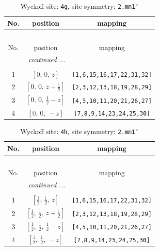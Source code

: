 \documentclass[fleqn,8pt]{jsarticle}
\begin{document}
\renewcommand{\arraystretch}{1.2}
\begin{longtable}{ccc}
\caption{Wyckoff site: {\tt 4g}, site symmetry: {\tt 2.mm1'}}
 \\
 \hline \hline
No. & position & mapping \\ \hline \endfirsthead

\multicolumn{2}{l}{\tablename\ \thetable{}} \\
 \hline \hline
No. & position & mapping \\ \hline \endhead

 \hline \hline
\multicolumn{2}{r}{\footnotesize\it continued ...} \\ \endfoot

 \hline \hline
\multicolumn{2}{r}{} \\ \endlastfoot

1 & $\left[ 0,\, 0,\, z \right]$ & {\tt [1,6,15,16,17,22,31,32]} \\ \hline
2 & $\left[ 0,\, 0,\, z + \frac{1}{2} \right]$ & {\tt [2,3,12,13,18,19,28,29]} \\ \hline
3 & $\left[ 0,\, 0,\, \frac{1}{2} - z \right]$ & {\tt [4,5,10,11,20,21,26,27]} \\ \hline
4 & $\left[ 0,\, 0,\, - z \right]$ & {\tt [7,8,9,14,23,24,25,30]} \\
\end{longtable}
\renewcommand{\arraystretch}{1.2}
\begin{longtable}{ccc}
\caption{Wyckoff site: {\tt 4h}, site symmetry: {\tt 2.mm1'}}
 \\
 \hline \hline
No. & position & mapping \\ \hline \endfirsthead

\multicolumn{2}{l}{\tablename\ \thetable{}} \\
 \hline \hline
No. & position & mapping \\ \hline \endhead

 \hline \hline
\multicolumn{2}{r}{\footnotesize\it continued ...} \\ \endfoot

 \hline \hline
\multicolumn{2}{r}{} \\ \endlastfoot

1 & $\left[ \frac{1}{2},\, \frac{1}{2},\, z \right]$ & {\tt [1,6,15,16,17,22,31,32]} \\ \hline
2 & $\left[ \frac{1}{2},\, \frac{1}{2},\, z + \frac{1}{2} \right]$ & {\tt [2,3,12,13,18,19,28,29]} \\ \hline
3 & $\left[ \frac{1}{2},\, \frac{1}{2},\, \frac{1}{2} - z \right]$ & {\tt [4,5,10,11,20,21,26,27]} \\ \hline
4 & $\left[ \frac{1}{2},\, \frac{1}{2},\, - z \right]$ & {\tt [7,8,9,14,23,24,25,30]} \\
\end{longtable}
\end{document}
